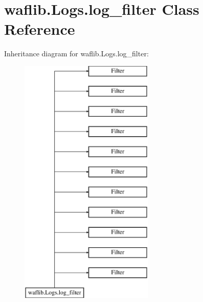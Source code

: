 \hypertarget{classwaflib_1_1_logs_1_1log__filter}{}\section{waflib.\+Logs.\+log\+\_\+filter Class Reference}
\label{classwaflib_1_1_logs_1_1log__filter}
Inheritance diagram for waflib.\+Logs.\+log\+\_\+filter\+:\begin{figure}[H]
\begin{center}
\leavevmode
\includegraphics[height=12.000000cm]{classwaflib_1_1_logs_1_1log__filter}
\end{center}
\end{figure}
